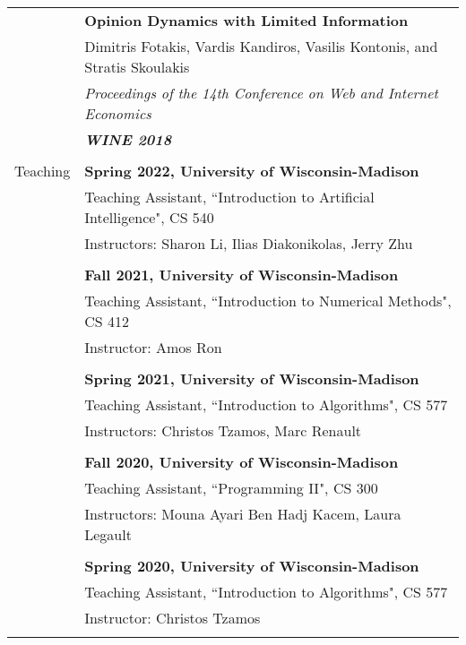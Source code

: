 \documentclass[letterpaper,11pt,oneside]{article}
\begin{document}
\begin{longtable}{@{} l l}
     & \textbf{Opinion Dynamics with Limited Information} \\
     & Dimitris Fotakis, Vardis Kandiros, Vasilis Kontonis, and Stratis Skoulakis\\
     & \emph{Proceedings of the 14th Conference on Web and Internet Economics} \\
     & \emph{\textbf{WINE 2018}} \\
     & \\


  \Large{Teaching}

  & \textbf{Spring 2022, University of Wisconsin-Madison} \\
  & Teaching Assistant, ``Introduction to Artificial Intelligence", CS 540\\
  & Instructors: Sharon Li, Ilias Diakonikolas, Jerry Zhu \\
  & \\

  & \textbf{Fall 2021, University of Wisconsin-Madison} \\
  & Teaching Assistant, ``Introduction to Numerical Methods", CS 412\\
  & Instructor: Amos Ron\\
  & \\

  & \textbf{Spring 2021, University of Wisconsin-Madison} \\
  & Teaching Assistant, ``Introduction to Algorithms", CS 577 \\
  & Instructors: Christos Tzamos, Marc Renault \\
  & \\

  & \textbf{Fall 2020, University of Wisconsin-Madison} \\
  & Teaching Assistant, ``Programming II", CS 300 \\
  & Instructors: Mouna Ayari Ben Hadj Kacem, Laura Legault \\
  & \\

  & \textbf{Spring 2020, University of Wisconsin-Madison} \\
  & Teaching Assistant, ``Introduction to Algorithms", CS 577 \\
  & Instructor: Christos Tzamos \\
  & \\


\end{longtable}
\end{document}
